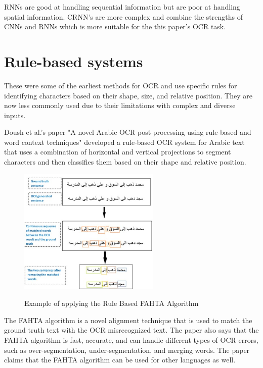 RNNs are good at handling sequential information but are poor at handling spatial information. CRNN's are more complex and combine the strengths of CNNs and RNNs which is more suitable for the this paper's OCR task.



\newpage

\section{Rule-based systems}

These were some of the earliest methods for OCR and use specific rules for identifying characters based on their shape, size, and relative position. They are now less commonly used due to their limitations with complex and diverse inputs.

Doush et al.'s paper "A novel Arabic OCR post-processing using rule-based and word context techniques" developed a rule-based OCR system for Arabic text that uses a combination of horizontal and vertical projections to segment characters and then classifies them based on their shape and relative position. \cite{doushNovelArabicOCR2018}



\begin{figure}[ht]
    \centering
    \includegraphics[width=0.6\textwidth]{Figures/RB_Doush.jpg}
    \caption[Example of applying the Rule Based FAHTA Algorithm]{Example of applying the Rule Based FAHTA Algorithm}\cite{doushNovelArabicOCR2018}
    \label{fig:Doush Rule Based OCR Paper}
\end{figure}

The FAHTA algorithm is a novel alignment technique that is used to match the ground truth text with the OCR misrecognized text. The paper also says that the FAHTA algorithm is fast, accurate, and can handle different types of OCR errors, such as over-segmentation, under-segmentation, and merging words. The paper claims that the FAHTA algorithm can be used for other languages as well.


